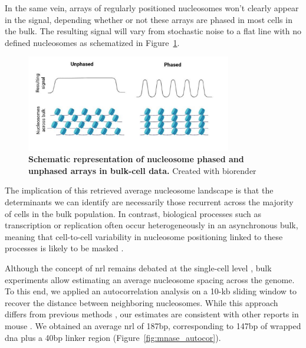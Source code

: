 \documentclass[11pt]{book}
\begin{document}
In the same vein, arrays of regularly positioned nucleosomes won't clearly appear in the signal, depending whether or not these arrays are phased in most cells in the bulk. The resulting signal will vary from stochastic noise to a flat line with no defined nucleosomes as schematized in Figure~\ref{fig:phased_nuc}.

\begin{figure}[htbp]
    \centering
    \includegraphics[width=0.8\textwidth]{Figures/Results/phased_nucleosomes.pdf}
    \caption{\textbf{Schematic representation of nucleosome phased and unphased arrays in bulk-cell data.} Created with biorender}
    \label{fig:phased_nuc}
\end{figure}

The implication of this retrieved average nucleosome landscape is that the determinants we can identify are necessarily those recurrent across the majority of cells in the bulk population. In contrast, biological processes such as transcription or replication often occur heterogeneously in an asynchronous bulk, meaning that cell-to-cell variability in nucleosome positioning linked to these processes is likely to be masked \cite{jiang_nucleosome_2009}.

Although the concept of \gls{nrl} remains debated at the single-cell level \cite{ricci_chromatin_2015}, bulk experiments allow estimating an average nucleosome spacing across the genome. To this end, we applied an autocorrelation analysis on a 10-kb sliding window to recover the distance between neighboring nucleosomes. While this approach differs from previous methods \cite{valouev_determinants_2011}, our estimates are consistent with other reports in mouse \cite{teif_genome-wide_2012}. We obtained an average \gls{nrl} of 187bp, corresponding to 147bp of wrapped \gls{dna} plus a 40bp linker region (Figure~\ref{fig:mnase_autocor}).
\end{document}

